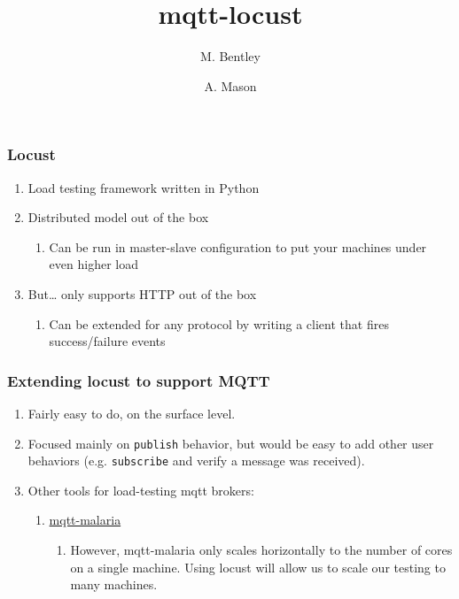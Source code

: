 \documentclass{beamer}
\title{mqtt-locust}
\author[Bentley, Mason]
{
    M. Bentley \and A. Mason\\
    \email{\{void,null\}@case.edu}
}
\institute[CWRU]{Case Western Reserve University}
\begin{document}
\frame{\titlepage}

\begin{frame}
    \frametitle{Locust}
    \begin{enumerate}
        \item Load testing framework written in Python
        \item
            Distributed model out of the box
            \begin{enumerate}
                \item Can be run in master-slave configuration to put your
                machines under even higher load
            \end{enumerate}
        \item
            But… only supports HTTP out of the box
            \begin{enumerate}
                \item Can be extended for any protocol by writing a client that
                fires success/failure events
            \end{enumerate}
    \end{enumerate}
\end{frame}

\begin{frame}
    \frametitle{Extending locust to support MQTT}
    \begin{enumerate}
        \item Fairly easy to do, on the surface level.
        \item Focused mainly on \texttt{publish} behavior, but would be easy to
        add other user behaviors (e.g. \texttt{subscribe} and verify a message
        was received).
        \item
            Other tools for load-testing mqtt brokers:
            \begin{enumerate}
                \item
                    \href{https://github.com/leandog/mqtt-malaria}{mqtt-malaria}
                    \begin{enumerate}
                        \item However, mqtt-malaria only scales horizontally to
                        the number of cores on a single machine. Using locust
                        will allow us to scale our testing to many machines.
                    \end{enumerate}
            \end{enumerate}
    \end{enumerate}
\end{frame}
\end{document}
